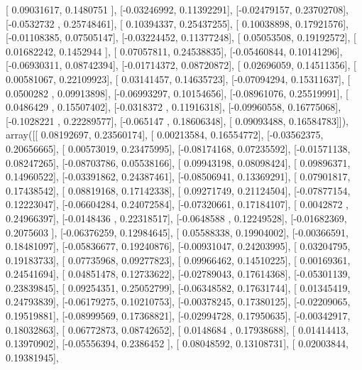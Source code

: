 \documentclass{article}
\begin{document}
       [ 0.09031617,  0.1480751 ],
       [-0.03246992,  0.11392291],
       [-0.02479157,  0.23702708],
       [-0.0532732 ,  0.25748461],
       [ 0.10394337,  0.25437255],
       [ 0.10038898,  0.17921576],
       [-0.01108385,  0.07505147],
       [-0.03224452,  0.11377248],
       [ 0.05053508,  0.19192572],
       [ 0.01682242,  0.1452944 ],
       [ 0.07057811,  0.24538835],
       [-0.05460844,  0.10141296],
       [-0.06930311,  0.08742394],
       [-0.01714372,  0.08720872],
       [ 0.02696059,  0.14511356],
       [ 0.00581067,  0.22109923],
       [ 0.03141457,  0.14635723],
       [-0.07094294,  0.15311637],
       [ 0.0500282 ,  0.09913898],
       [-0.06993297,  0.10154656],
       [-0.08961076,  0.25519991],
       [ 0.0486429 ,  0.15507402],
       [-0.0318372 ,  0.11916318],
       [-0.09960558,  0.16775068],
       [-0.1028221 ,  0.22289577],
       [-0.065147  ,  0.18606348],
       [ 0.09093488,  0.16584783]]), array([[ 0.08192697,  0.23560174],
       [ 0.00213584,  0.16554772],
       [-0.03562375,  0.20656665],
       [ 0.00573019,  0.23475995],
       [-0.08174168,  0.07235592],
       [-0.01571138,  0.08247265],
       [-0.08703786,  0.05538166],
       [ 0.09943198,  0.08098424],
       [ 0.09896371,  0.14960522],
       [-0.03391862,  0.24387461],
       [-0.08506941,  0.13369291],
       [ 0.07901817,  0.17438542],
       [ 0.08819168,  0.17142338],
       [ 0.09271749,  0.21124504],
       [-0.07877154,  0.12223047],
       [-0.06604284,  0.24072584],
       [-0.07320661,  0.17184107],
       [ 0.0042872 ,  0.24966397],
       [-0.0148436 ,  0.22318517],
       [-0.0648588 ,  0.12249528],
       [-0.01682369,  0.2075603 ],
       [-0.06376259,  0.12984645],
       [ 0.05588338,  0.19904002],
       [-0.00366591,  0.18481097],
       [-0.05836677,  0.19240876],
       [-0.00931047,  0.24203995],
       [ 0.03204795,  0.19183733],
       [ 0.07735968,  0.09277823],
       [ 0.09966462,  0.14510225],
       [ 0.00169361,  0.24541694],
       [ 0.04851478,  0.12733622],
       [-0.02789043,  0.17614368],
       [-0.05301139,  0.23839845],
       [ 0.09254351,  0.25052799],
       [-0.06348582,  0.17631744],
       [ 0.01345419,  0.24793839],
       [-0.06179275,  0.10210753],
       [-0.00378245,  0.17380125],
       [-0.02209065,  0.19519881],
       [-0.08999569,  0.17368821],
       [-0.02994728,  0.17950635],
       [-0.00342917,  0.18032863],
       [ 0.06772873,  0.08742652],
       [ 0.0148684 ,  0.17938688],
       [ 0.01414413,  0.13970902],
       [-0.05556394,  0.2386452 ],
       [ 0.08048592,  0.13108731],
       [ 0.02003844,  0.19381945],
\end{document}
